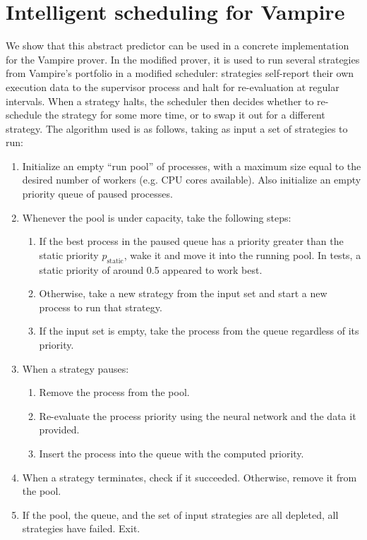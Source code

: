 \documentclass{llncs}
\begin{document}
\section{Intelligent scheduling for Vampire} \label{sec:intelligent}
%
We show that this abstract predictor can be used in a concrete implementation for the Vampire prover.
In the modified prover, it is used to run several strategies from Vampire's portfolio in a modified scheduler: strategies self-report their own execution data to the supervisor process and halt for re-evaluation at regular intervals.
When a strategy halts, the scheduler then decides whether to re-schedule the strategy for some more time, or to swap it out for a different strategy.
The algorithm used is as follows, taking as input a set of strategies to run: \
\begin{enumerate}
	\item Initialize an empty ``run pool'' of processes, with a maximum size equal to the desired number of workers (e.g. CPU cores available). Also initialize an empty priority queue of paused processes.
	\item Whenever the pool is under capacity, take the following steps:
	\begin{enumerate}
		\item If the best process in the paused queue has a priority greater than the static priority \(p_\textrm{static}\), wake it and move it into the running pool. In tests, a static priority of around 0.5 appeared to work best.
		\item Otherwise, take a new strategy from the input set and start a new process to run that strategy.
		\item If the input set is empty, take the process from the queue regardless of its priority.
	\end{enumerate}
	\item When a strategy pauses:
	\begin{enumerate}
		\item Remove the process from the pool.
		\item Re-evaluate the process priority using the neural network and the data it provided.
		\item Insert the process into the queue with the computed priority.
	\end{enumerate}
	\item When a strategy terminates, check if it succeeded. Otherwise, remove it from the pool.
	\item If the pool, the queue, and the set of input strategies are all depleted, all strategies have failed. Exit.
\end{enumerate}
\end{document}
